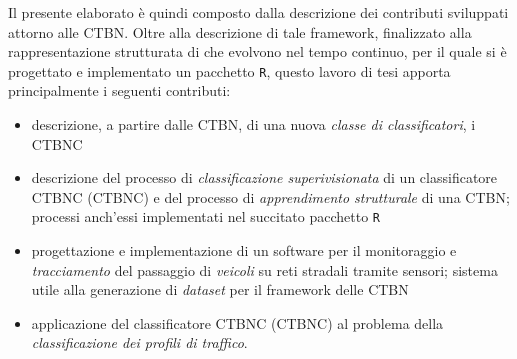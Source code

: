 Il presente elaborato è quindi composto dalla descrizione dei contributi sviluppati attorno alle \acl{CTBN}. Oltre alla descrizione di tale framework, finalizzato alla rappresentazione strutturata di \mprocess{} che evolvono nel tempo continuo, per il quale si è progettato e implementato un pacchetto \lstinline[]|R|, questo lavoro di tesi apporta principalmente i seguenti contributi:
\begin{itemize}
	\item descrizione, a partire dalle \acs{CTBN}, di una nuova \emph{classe di classificatori}, i \acf{CTBNC} \citep{Stella2012}
	\item descrizione del processo di \emph{classificazione superivisionata} di un classificatore \acl{CTBNC} (\acs{CTBNC}) e del processo di \emph{apprendimento strutturale} di una \acs{CTBN}; processi anch'essi implementati nel succitato pacchetto \lstinline[]|R|
	\item progettazione e implementazione di un software per il monitoraggio e \emph{tracciamento} del passaggio di \emph{veicoli} su reti stradali tramite sensori; sistema utile alla generazione di \emph{dataset} per il framework delle \acs{CTBN}
	\item applicazione del classificatore \acs{CTBNC} (\acs{CTBNC}) al problema della \emph{classificazione dei profili di traffico}.
\end{itemize}

